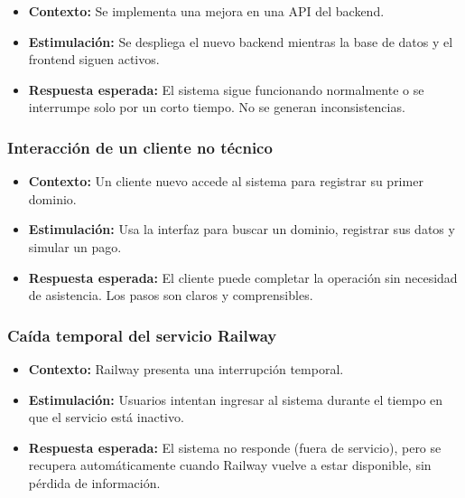 \begin{itemize}
\item \textbf{Contexto:} Se implementa una mejora en una API del backend.

\item \textbf{Estimulación:} Se despliega el nuevo backend mientras la base de datos y el frontend siguen activos.

\item \textbf{Respuesta esperada:} El sistema sigue funcionando normalmente o se interrumpe solo por un corto tiempo. No se generan inconsistencias.
\end{itemize}

\subsubsection*{Interacción de un cliente no técnico}

\begin{itemize}
\item \textbf{Contexto:} Un cliente nuevo accede al sistema para registrar su primer dominio.

\item \textbf{Estimulación:} Usa la interfaz para buscar un dominio, registrar sus datos y simular un pago.

\item \textbf{Respuesta esperada:} El cliente puede completar la operación sin necesidad de asistencia. Los pasos son claros y comprensibles.
\end{itemize}

\subsubsection*{Caída temporal del servicio Railway}

\begin{itemize}
\item \textbf{Contexto:} Railway presenta una interrupción temporal.

\item \textbf{Estimulación:} Usuarios intentan ingresar al sistema durante el tiempo en que el servicio está inactivo.

\item \textbf{Respuesta esperada:} El sistema no responde (fuera de servicio), pero se recupera automáticamente cuando Railway vuelve a estar disponible, sin pérdida de información.
\end{itemize}
